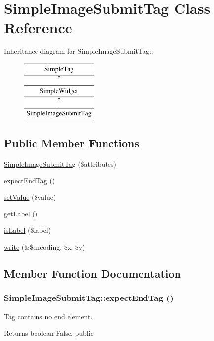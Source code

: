 \hypertarget{class_simple_image_submit_tag}{
\section{SimpleImageSubmitTag Class Reference}
\label{class_simple_image_submit_tag}
}
Inheritance diagram for SimpleImageSubmitTag::\begin{figure}[H]
\begin{center}
\leavevmode
\includegraphics[height=3cm]{class_simple_image_submit_tag}
\end{center}
\end{figure}
\subsection*{Public Member Functions}
\begin{DoxyCompactItemize}
\item 
\hyperlink{class_simple_image_submit_tag_abcccdd6803d3460d5ed4a0c7e1b54d2d}{SimpleImageSubmitTag} (\$attributes)
\item 
\hyperlink{class_simple_image_submit_tag_ab999199b59399e7fc709c1b3a9f03227}{expectEndTag} ()
\item 
\hyperlink{class_simple_image_submit_tag_ae66a60f527c8cde0d2fd883c3d894da3}{setValue} (\$value)
\item 
\hyperlink{class_simple_image_submit_tag_a40627673e9710873f88088cc4c327afe}{getLabel} ()
\item 
\hyperlink{class_simple_image_submit_tag_ab38d48f8710f8df763ff0753f8035146}{isLabel} (\$label)
\item 
\hyperlink{class_simple_image_submit_tag_ac00f37c50fa16598fbefc7964de0833f}{write} (\&\$encoding, \$x, \$y)
\end{DoxyCompactItemize}


\subsection{Member Function Documentation}
\hypertarget{class_simple_image_submit_tag_ab999199b59399e7fc709c1b3a9f03227}{
\subsubsection[{expectEndTag}]{\setlength{\rightskip}{0pt plus 5cm}SimpleImageSubmitTag::expectEndTag ()}}
\label{class_simple_image_submit_tag_ab999199b59399e7fc709c1b3a9f03227}
Tag contains no end element. \begin{DoxyReturn}{Returns}
boolean False.  public 
\end{DoxyReturn}


